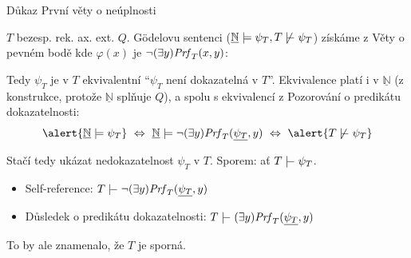 \documentclass{beamer}
\begin{document}
\begin{frame}{Důkaz První věty o neúplnosti}

    \pause
    $T$ bezesp. rek. ax. ext. $Q$. Gödelovu sentenci ($\underline{\mathbb N}\models\psi_T,T\not\proves\psi_T$) získáme z Věty o pevném bodě kde $\varphi(x)$ je \alert{$\neg(\exists y)\mathit{Prf}_T(x,y)$}:

    \pause

    \pause
    Tedy $\psi_T$ je v $T$ ekvivalentní ``$\psi_T$ není dokazatelná v $T$''. Ekvivalence platí i v $\underline{\mathbb N}$ (z konstrukce, protože $\underline{\mathbb N}$ splňuje $Q$), a spolu s ekvivalencí z Pozorování o predikátu dokazatelnosti: \pause
    $$
    \alert{\underline{\mathbb N}\models\psi_T}\ \Leftrightarrow\ 
    \underline{\mathbb N}\models\neg(\exists y)\Prf_T(\underline{\psi_T},y)\ \Leftrightarrow\ \alert{T\not\proves\psi_T}
    $$    

    \pause
    Stačí tedy ukázat nedokazatelnost $\psi_T$ v $T$. \alert{Sporem: ať $T\proves\psi_T$. }
    
    \pause
    \begin{itemize}
        \item Self-reference: $T\proves\neg(\exists y)\Prf_T(\underline{\psi_T},y)$\pause
        \item Důsledek o predikátu dokazatelnosti: $T\proves (\exists y)\Prf_T(\underline{\psi_T},y)$\pause
    \end{itemize}
    To by ale znamenalo, že $T$ je sporná.\hfill\qedsymbol
    
\end{frame}
\end{document}
